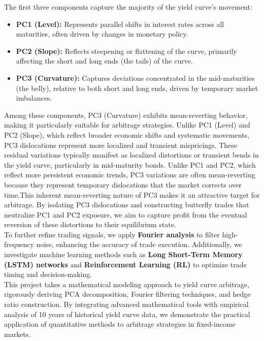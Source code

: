 \documentclass[12pt]{article}
\begin{document}
The first three components capture the majority of the yield curve's movement:
\begin{itemize}
    \item \textbf{PC1 (Level):} Represents parallel shifts in interest rates across all maturities, often driven by changes in monetary policy.
    \item \textbf{PC2 (Slope):} Reflects steepening or flattening of the curve, primarily affecting the short and long ends (the tails) of the curve.
    \item \textbf{PC3 (Curvature):} Captures deviations concentrated in the mid-maturities (the belly), relative to both short and long ends, driven by temporary market imbalances.
\end{itemize}

Among these components, PC3 (Curvature) exhibits mean-reverting behavior, making it particularly suitable for arbitrage strategies. Unlike PC1 (Level) and PC2 (Slope), which reflect broader economic shifts and systematic movements, PC3 dislocations represent more localized and transient mispricings. These residual variations typically manifest as localized distortions or transient bends in the yield curve, particularly in mid-maturity bonds. Unlike PC1 and PC2, which reflect more persistent economic trends, PC3 variations are often mean-reverting because they represent temporary dislocations that the market corrects over time.This inherent mean-reverting nature of PC3 makes it an attractive target for arbitrage. By isolating PC3 dislocations and constructing butterfly trades that neutralize PC1 and PC2 exposure, we aim to capture profit from the eventual reversion of these distortions to their equilibrium state.\\

To further refine trading signals, we apply \textbf{Fourier analysis} to filter high-frequency noise, enhancing the accuracy of trade execution. Additionally, we investigate machine learning methods such as \textbf{Long Short-Term Memory (LSTM) networks} and \textbf{Reinforcement Learning (RL)} to optimize trade timing and decision-making.\\

This project takes a mathematical modeling approach to yield curve arbitrage, rigorously deriving PCA decomposition, Fourier filtering techniques, and hedge ratio construction. By integrating advanced mathematical tools with empirical analysis of 10 years of historical yield curve data, we demonstrate the practical application of quantitative methods to arbitrage strategies in fixed-income markets.
\end{document}
